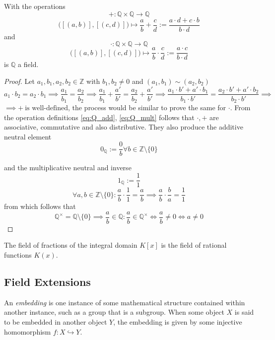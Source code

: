 \begin{proposition}\label{pro:Q_field}
   With the operations
   \[+: \mathbb{Q} \times \mathbb{Q} \to \mathbb{Q}\]
   \begin{equation}\label{eq:Q_add}
      \big([(a, b)], [(c, d)]\big) \mapsto \frac{a}{b} + \frac{c}{d} := \frac{a \cdot d + c \cdot b}{b \cdot d}
   \end{equation}
   and
   \[\cdot: \mathbb{Q} \times \mathbb{Q} \to \mathbb{Q}\]
   \begin{equation}\label{eq:Q_mult}
      \big([(a, b)], [(c, d)]\big) \mapsto \frac{a}{b} \cdot \frac{c}{d} := \frac{a \cdot c}{b \cdot d}
   \end{equation}
   is \(\mathbb{Q}\) a field.
\end{proposition}
\begin{proof}
   Let \(a_1, b_1, a_2, b_2 \in \mathbb{Z}\) with \(b_1, b_2 \neq 0\) and \((a_1, b_1) \sim (a_2, b_2)\)
   \[a_1 \cdot b_2 = a_2 \cdot b_1 \implies \frac{a_1}{b_1} = \frac{a_2}{b_2} \implies \frac{a_1}{b_1} + \frac{a'}{b'} = \frac{a_2}{b_2} + \frac{a'}{b'} \implies \frac{a_1 \cdot b' + a' \cdot b_1}{b_1 \cdot b'} = \frac{a_2 \cdot b' + a' \cdot b_2}{b_2 \cdot b'} \implies\]
   \(\implies +~\text{is well-defined}\), the process would be similar to prove the same for \(\cdot\).
   From the operation definitions \cref{eq:Q_add}, \cref{eq:Q_mult} follows that \(\cdot, +\) are associative, commutative and also distributive.
   They also produce the additive neutral element
   \[0_{\mathbb{Q}} := \frac{0}{b} \forall b \in \mathbb{Z} \setminus \{0\}\]

   and the multiplicative neutral and inverse
   \[1_{\mathbb{Q}} := \frac{1}{1}\]
   \[\forall a, b \in \mathbb{Z} \setminus \{0\}: \frac{a}{b} \cdot \frac{1}{1} = \frac{a}{b} \implies \frac{a}{b} \cdot \frac{b}{a} = \frac{1}{1}\]
   from which follows that
   \[\mathbb{Q}^{\times} = \mathbb{Q} \setminus \{0\} \implies \frac{a}{b} \in \mathbb{Q}: \frac{a}{b} \in \mathbb{Q}^{\times} \iff \frac{a}{b} \neq 0 \iff a \neq 0\]
\end{proof}

\begin{proposition}
   The field of fractions of the integral domain \(K[x]\) is the field of rational functions \(K(x)\).
\end{proposition}

\subsection{Field Extensions}
An \emph{embedding} is one instance of some mathematical structure contained within another instance, such as a group that is a subgroup.
When some object \(X\) is said to be embedded in another object \(Y\), the embedding is given by some injective homomorphism \(f: X \hookrightarrow Y\).

